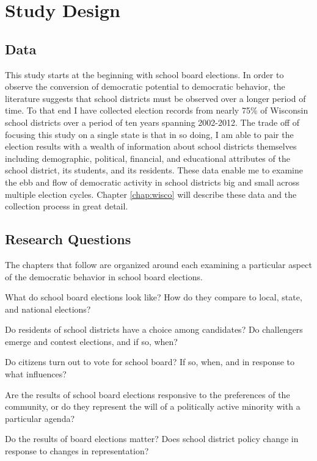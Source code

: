 \section{Study Design}

\subsection{Data}

This study starts at the beginning with school board elections. In order to observe 
the conversion of democratic potential to democratic behavior, the literature 
suggests that school districts must be observed over a longer period of time. To 
that end I have collected election records from nearly 75\% of Wisconsin school 
districts over a period of ten years spanning 2002-2012. The trade off of focusing 
this study on a single state is that in so doing, I am able to pair the election 
results with a wealth of information about school districts themselves including 
demographic, political, financial, and educational attributes of the school 
district, its students, and its residents. These data enable me to examine the 
ebb and flow of democratic activity in school districts big and small across 
multiple election cycles. Chapter \ref{chap:wisco} will describe these data and 
the collection process in great detail. 

\subsection{Research Questions}

The chapters that follow are organized around each examining a particular aspect 
of the democratic behavior in school board elections. 

\vspace{-6mm}
\begin{enumerate}
\begin{singlespace}
\setlength\itemsep{-6pt}
\item What do school board elections look like? How do they compare to local, state, 
and national elections?
\item Do residents of school districts have a choice among candidates? Do challengers 
emerge and contest elections, and if so, when?
\item Do citizens turn out to vote for school board? If so, when, and in response to 
what influences?
\item Are the results of school board elections responsive to the preferences of the 
community, or do they represent the will of a politically active minority with a 
particular agenda?
\item Do the results of board elections matter? Does school district policy change 
in response to changes in representation?
\end{singlespace}
\end{enumerate}
\vspace{-3mm}

